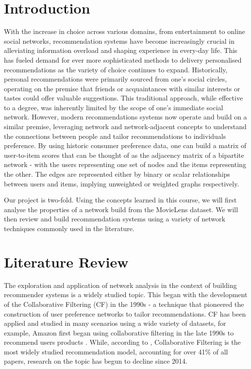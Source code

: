 \documentclass[12pt]{article}
\numberwithin{equation}{section}
\begin{document}
\newpage

\section{Introduction}

With the increase in choice across various domains, from entertainment to online social networks, recommendation systems have become increasingly crucial in alleviating information overload and shaping experience in every-day life. This has fueled demand for ever more sophisticated methods to delivery personalised recommendations as the variety of choice continues to expand. Historically, personal recommendations were primarily sourced from one's social circles, operating on the premise that friends or acquaintances with similar interests or tastes could offer valuable suggestions. This traditional approach, while effective to a degree, was inherently limited by the scope of one's immediate social network. However, modern recommendations systems now operate and build on a similar premise, leveraging network and network-adjacent concepts to understand the connections between people and tailor recommendations to individuals preference. By using historic consumer preference data, one can build a matrix of user-to-item scores that can be thought of as the adjacency matrix of a bipartite network - with the users representing one set of nodes and the items representing the other. The edges are represented either by binary or scalar relationships between users and items, implying unweighted or weighted graphs respectively.

Our project is two-fold. Using the concepts learned in this course, we will first analyse the properties of a network build from the MovieLens dataset. We will then review and build recommendation systems using a variety of network techniques commonly used in the literature.

\section{Literature Review}

The exploration and application of network analysis in the context of building recommender systems is a widely studied topic. This began with the development of the Collaborative Filtering (CF) in the 1990s - a technique that pioneered the construction of user preference networks to tailor recommendations. CF has been applied and studied in many scenarios using a wide variety of datasets, for example, Amazon first began using collaborative filtering in the late 1990s to recommend users products \cite{collab_f}. While, according to \cite{survey_reccomendation}, Collaborative Filtering is the most widely studied recommendation model, accounting for over 41\% of all papers, research on the topic has begun to decline since 2014.
\end{document}

